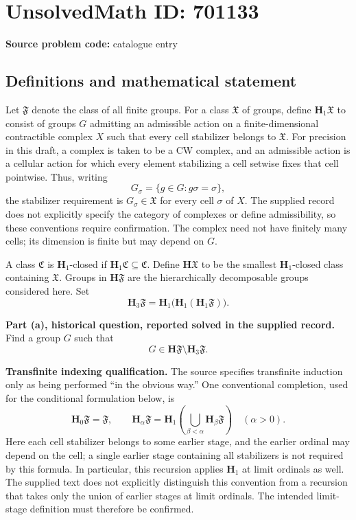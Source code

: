 \documentclass[11pt]{article}
\begin{document}
\section*{UnsolvedMath ID: 701133}
\textbf{Source problem code:} catalogue entry
\subsection{Definitions and mathematical statement}
Let \(\mathfrak F\) denote the class of all finite groups. For a class \(\mathfrak X\) of groups, define \(\mathbf H_1\mathfrak X\) to consist of groups \(G\) admitting an admissible action on a finite-dimensional contractible complex \(X\) such that every cell stabilizer belongs to \(\mathfrak X\). For precision in this draft, a complex is taken to be a CW complex, and an admissible action is a cellular action for which every element stabilizing a cell setwise fixes that cell pointwise. Thus, writing
\[
G_\sigma=\{g\in G:g\sigma=\sigma\},
\]
the stabilizer requirement is \(G_\sigma\in\mathfrak X\) for every cell \(\sigma\) of \(X\). The supplied record does not explicitly specify the category of complexes or define admissibility, so these conventions require confirmation. The complex need not have finitely many cells; its dimension is finite but may depend on \(G\).

A class \(\mathfrak C\) is \(\mathbf H_1\)-closed if \(\mathbf H_1\mathfrak C\subseteq\mathfrak C\). Define \(\mathbf H\mathfrak X\) to be the smallest \(\mathbf H_1\)-closed class containing \(\mathfrak X\). Groups in \(\mathbf H\mathfrak F\) are the hierarchically decomposable groups considered here. Set
\[
\mathbf H_3\mathfrak F
=\mathbf H_1\bigl(\mathbf H_1(\mathbf H_1\mathfrak F)\bigr).
\]

\textbf{Part (a), historical question, reported solved in the supplied record.} Find a group \(G\) such that
\[
G\in\mathbf H\mathfrak F\setminus\mathbf H_3\mathfrak F.
\]

\textbf{Transfinite indexing qualification.} The source specifies transfinite induction only as being performed ``in the obvious way.'' One conventional completion, used for the conditional formulation below, is
\[
\mathbf H_0\mathfrak F=\mathfrak F,\qquad
\mathbf H_\alpha\mathfrak F
=\mathbf H_1\left(\bigcup_{\beta<\alpha}\mathbf H_\beta\mathfrak F\right)
\quad(\alpha>0).
\]
Here each cell stabilizer belongs to some earlier stage, and the earlier ordinal may depend on the cell; a single earlier stage containing all stabilizers is not required by this formula. In particular, this recursion applies \(\mathbf H_1\) at limit ordinals as well. The supplied text does not explicitly distinguish this convention from a recursion that takes only the union of earlier stages at limit ordinals. The intended limit-stage definition must therefore be confirmed.
\end{document}
